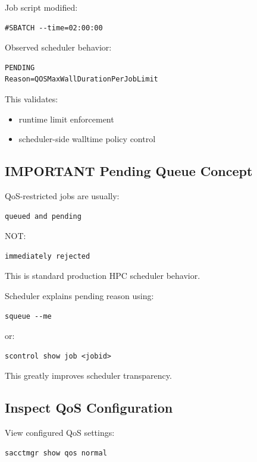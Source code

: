 \documentclass[11pt]{article}
\begin{document}
Job script modified:

\begin{verbatim}
#SBATCH --time=02:00:00
\end{verbatim}

Observed scheduler behavior:

\begin{verbatim}
PENDING
Reason=QOSMaxWallDurationPerJobLimit
\end{verbatim}

This validates:

\begin{itemize}
\item runtime limit enforcement
\item scheduler-side walltime policy control
\end{itemize}
\subsection{IMPORTANT Pending Queue Concept}
\label{sec:org5fa7138}

QoS-restricted jobs are usually:

\begin{verbatim}
queued and pending
\end{verbatim}

NOT:

\begin{verbatim}
immediately rejected
\end{verbatim}

This is standard production HPC scheduler behavior.

Scheduler explains pending reason using:

\begin{verbatim}
squeue --me
\end{verbatim}

or:

\begin{verbatim}
scontrol show job <jobid>
\end{verbatim}

This greatly improves scheduler transparency.
\subsection{Inspect QoS Configuration}
\label{sec:org66f9e3e}

View configured QoS settings:

\begin{verbatim}
sacctmgr show qos normal
\end{verbatim}
\end{document}
